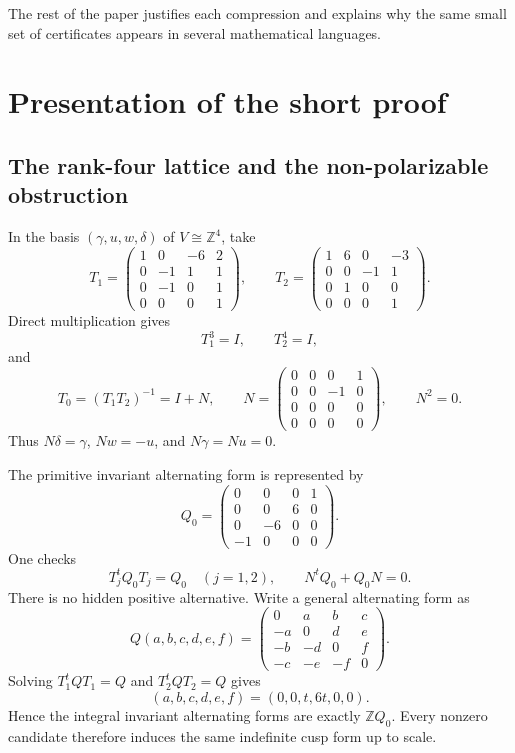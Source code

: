 \documentclass[11pt,reqno]{amsart}
\numberwithin{equation}{section}
\newcommand{\Z}{\mathbb Z}
\theoremstyle{definition}
\begin{document}
The rest of the paper justifies each compression and explains why the same small set of certificates appears in several mathematical languages.

\section{Presentation of the short proof}\label{sec:proof}

\subsection{The rank-four lattice and the non-polarizable obstruction}\label{sec:lattice}

In the basis $(\gamma,u,w,\delta)$ of $V\cong\Z^4$, take
\begin{equation}\label{eq:T1T2}
T_1=
\begin{pmatrix}
1&0&-6&2\\
0&-1&1&1\\
0&-1&0&1\\
0&0&0&1
\end{pmatrix},
\qquad
T_2=
\begin{pmatrix}
1&6&0&-3\\
0&0&-1&1\\
0&1&0&0\\
0&0&0&1
\end{pmatrix}.
\end{equation}
Direct multiplication gives
\[
 T_1^3=I,
 \qquad
 T_2^4=I,
\]
and
\begin{equation}\label{eq:N}
T_0=(T_1T_2)^{-1}=I+N,
\qquad
N=
\begin{pmatrix}
0&0&0&1\\
0&0&-1&0\\
0&0&0&0\\
0&0&0&0
\end{pmatrix},
\qquad N^2=0.
\end{equation}
Thus $N\delta=\gamma$, $Nw=-u$, and $N\gamma=Nu=0$.

The primitive invariant alternating form is represented by
\begin{equation}\label{eq:Q0}
Q_0=
\begin{pmatrix}
0&0&0&1\\
0&0&6&0\\
0&-6&0&0\\
-1&0&0&0
\end{pmatrix}.
\end{equation}
One checks
\[
T_j^tQ_0T_j=Q_0
\quad(j=1,2),
\qquad
N^tQ_0+Q_0N=0.
\]
There is no hidden positive alternative. Write a general alternating form as
\[
Q(a,b,c,d,e,f)=
\begin{pmatrix}
0&a&b&c\\
-a&0&d&e\\
-b&-d&0&f\\
-c&-e&-f&0
\end{pmatrix}.
\]
Solving $T_1^tQT_1=Q$ and $T_2^tQT_2=Q$ gives
\[
(a,b,c,d,e,f)=(0,0,t,6t,0,0).
\]
Hence the integral invariant alternating forms are exactly $\Z Q_0$. Every nonzero candidate therefore induces the same indefinite cusp form up to scale.
\end{document}
